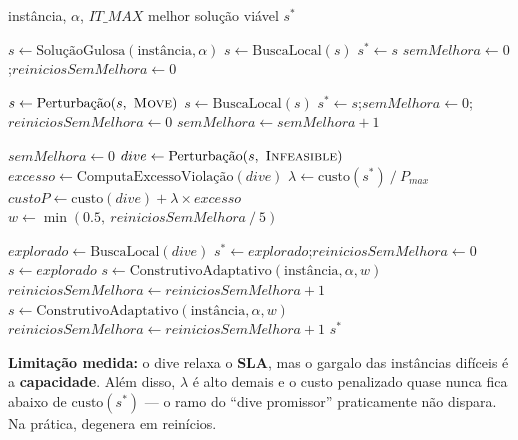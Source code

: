\documentclass{article}
\begin{document}
\begin{algorithm}[H]
\caption{ILS com Mergulho em Soluções Inviáveis (Caso A)}
\begin{algorithmic}[1]
\Require instância, $\alpha$, $IT\_MAX$
\Ensure melhor solução viável $s^*$

\State $s \leftarrow \text{SoluçãoGulosa}(\text{instância}, \alpha)$
\State $s \leftarrow \text{BuscaLocal}(s)$
\State $s^* \leftarrow s$
\State $semMelhora \leftarrow 0$;\quad $reiniciosSemMelhora \leftarrow 0$

    \State $s \leftarrow \text{Perturbação}(s,\ \textsc{Move})$
    \State $s \leftarrow \text{BuscaLocal}(s)$
        \State $s^* \leftarrow s$;\quad $semMelhora \leftarrow 0$;\quad $reiniciosSemMelhora \leftarrow 0$
    \Else
        \State $semMelhora \leftarrow semMelhora + 1$
    \EndIf

        \State $semMelhora \leftarrow 0$
        \State $dive \leftarrow \text{Perturbação}(s,\ \textsc{Infeasible})$
        \State $excesso \leftarrow \text{ComputaExcessoViolação}(dive)$
        \State $\lambda \leftarrow \text{custo}(s^*)\ /\ P_{max}$
        \State $custoP \leftarrow \text{custo}(dive) + \lambda \times excesso$
        \State $w \leftarrow \min(0.5,\ reiniciosSemMelhora\ /\ 5)$

            \State $explorado \leftarrow \text{BuscaLocal}(dive)$
                    \State $s^* \leftarrow explorado$;\quad $reiniciosSemMelhora \leftarrow 0$
                \EndIf
                \State $s \leftarrow explorado$
            \Else
                \State $s \leftarrow \text{ConstrutivoAdaptativo}(\text{instância}, \alpha, w)$
                \State $reiniciosSemMelhora \leftarrow reiniciosSemMelhora + 1$
            \EndIf
        \Else
            \State $s \leftarrow \text{ConstrutivoAdaptativo}(\text{instância}, \alpha, w)$
            \State $reiniciosSemMelhora \leftarrow reiniciosSemMelhora + 1$
        \EndIf
    \EndIf
\EndFor
\State \Return $s^*$
\end{algorithmic}
\end{algorithm}

\noindent\textbf{Limitação medida:} o dive relaxa o \textbf{SLA}, mas o gargalo das instâncias
difíceis é a \textbf{capacidade}. Além disso, $\lambda$ é alto demais e o custo penalizado quase
nunca fica abaixo de $\text{custo}(s^*)$ --- o ramo do ``dive promissor'' praticamente não dispara.
Na prática, degenera em reinícios.
\end{document}
